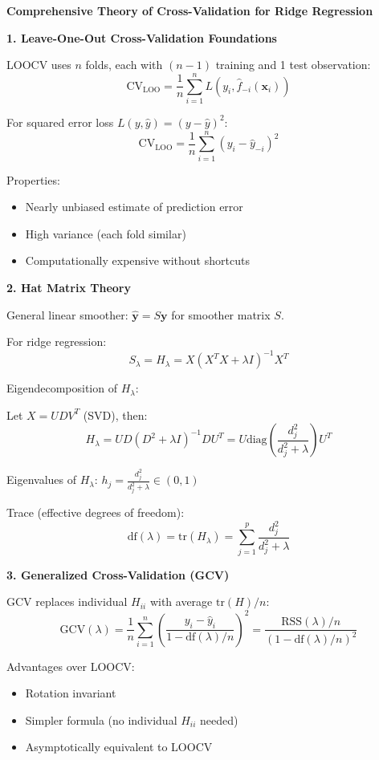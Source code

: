 \documentclass[12pt]{article}
\begin{document}
\begin{explanation}

\textbf{Comprehensive Theory of Cross-Validation for Ridge Regression}

\textbf{1. Leave-One-Out Cross-Validation Foundations}

LOOCV uses $n$ folds, each with $(n-1)$ training and 1 test observation:
\[\text{CV}_{\text{LOO}} = \frac{1}{n}\sum_{i=1}^{n}L(y_i, \hat{f}_{-i}(\mathbf{x}_i))\]

For squared error loss $L(y, \hat{y}) = (y - \hat{y})^2$:
\[\text{CV}_{\text{LOO}} = \frac{1}{n}\sum_{i=1}^{n}(y_i - \hat{y}_{-i})^2\]

Properties:
\begin{itemize}
\item Nearly unbiased estimate of prediction error
\item High variance (each fold similar)
\item Computationally expensive without shortcuts
\end{itemize}

\textbf{2. Hat Matrix Theory}

General linear smoother: $\hat{\mathbf{y}} = S\mathbf{y}$ for smoother matrix $S$.

For ridge regression:
\[S_\lambda = H_\lambda = X(X^TX + \lambda I)^{-1}X^T\]

Eigendecomposition of $H_\lambda$:

Let $X = UDV^T$ (SVD), then:
\[H_\lambda = UD(D^2 + \lambda I)^{-1}DU^T = U\text{diag}\left(\frac{d_j^2}{d_j^2 + \lambda}\right)U^T\]

Eigenvalues of $H_\lambda$: $h_j = \frac{d_j^2}{d_j^2 + \lambda} \in (0, 1)$

Trace (effective degrees of freedom):
\[\text{df}(\lambda) = \text{tr}(H_\lambda) = \sum_{j=1}^{p}\frac{d_j^2}{d_j^2 + \lambda}\]

\textbf{3. Generalized Cross-Validation (GCV)}

GCV replaces individual $H_{ii}$ with average $\text{tr}(H)/n$:
\[\text{GCV}(\lambda) = \frac{1}{n}\sum_{i=1}^{n}\left(\frac{y_i - \hat{y}_i}{1 - \text{df}(\lambda)/n}\right)^2 = \frac{\text{RSS}(\lambda)/n}{(1 - \text{df}(\lambda)/n)^2}\]

Advantages over LOOCV:
\begin{itemize}
\item Rotation invariant
\item Simpler formula (no individual $H_{ii}$ needed)
\item Asymptotically equivalent to LOOCV
\end{itemize}


\end{explanation}
\end{document}
